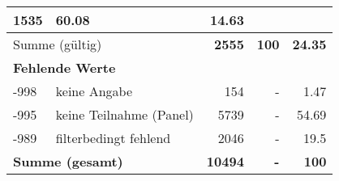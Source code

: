 \begin{longtable}{lXrrr}
       \num{1535} &
       \num[round-mode=places,round-precision=2]{60.08} &
         \num[round-mode=places,round-precision=2]{14.63} \\
     \midrule
     \multicolumn{2}{l}{Summe (gültig)} &
       \textbf{\num{2555}} &
     \textbf{\num{100}} &
       \textbf{\num[round-mode=places,round-precision=2]{24.35}} \\
     \multicolumn{5}{l}{\textbf{Fehlende Werte}}\\
       -998 &
       keine Angabe &
         \num{154} &
        - &
         \num[round-mode=places,round-precision=2]{1.47} \\
       -995 &
       keine Teilnahme (Panel) &
         \num{5739} &
        - &
         \num[round-mode=places,round-precision=2]{54.69} \\
       -989 &
       filterbedingt fehlend &
         \num{2046} &
        - &
         \num[round-mode=places,round-precision=2]{19.5} \\
     \midrule
     \multicolumn{2}{l}{\textbf{Summe (gesamt)}} &
          \textbf{\num{10494}} &
        \textbf{-} &
        \textbf{\num{100}} \\
     \bottomrule
     \end{longtable}
     
